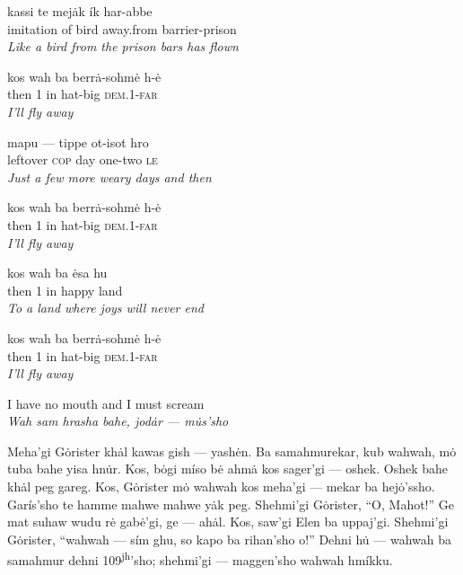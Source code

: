\documentclass{article}[10pt]
\begin{document}
\begin{exe}
\ex
\gll kassi te mej\.{a}k \'{i}k har-abbe\\
imitation of bird away.from barrier-prison\\
\trans \emph{Like a bird from the prison bars has flown}

\ex
\gll kos wah ba berr\.{a}-sohm\.{e} h-\.{e}\\
then 1 in hat-big \textsc{dem.1}-\textsc{far}\\
\trans \emph{I'll fly away}

\ex
\gll mapu --- tippe ot-isot hro\\
leftover \textsc{cop} day one-two \textsc{le}\\
\trans \emph{Just a few more weary days and then}

\ex
\gll kos wah ba berr\.{a}-sohm\.{e} h-\.{e}\\
then 1 in hat-big \textsc{dem.1}-\textsc{far}\\
\trans \emph{I'll fly away}

\ex
\gll kos wah ba \.{e}sa hu\\
then 1 in happy land\\
\trans \emph{To a land where joys will never end}

\ex
\gll kos wah ba berr\.{a}-sohm\.{e} h-\.{e}\\
then 1 in hat-big \textsc{dem.1}-\textsc{far}\\
\trans \emph{I'll fly away}

\end{exe}
\clearpage

\begin{center}
I have no mouth and I must scream\\
\emph{Wah sam hrasha bahe, jod\.{a}r --- m\.{u}s'sho}\\
\end{center}

Meha'gi G\.{o}rister kh\.{a}l kawas gish --- yash\.{e}n. Ba samahmurekar, kub wahwah, m\.{o} tuba bahe yisa hn\.{u}r. Kos, b\.{o}gi m\'{i}so b\.{e} ahm\.{a} kos sager'gi --- oshek. Oshek bahe kh\.{a}l peg gareg. Kos, G\.{o}rister m\.{o} wahwah kos meha'gi --- mekar ba hej\.{o}'ssho. Gar\'{i}s'sho te hamme mahwe mahwe y\.{a}k peg. Shehmi'gi G\.{o}rister, ``O, Mahot!'' Ge mat suhaw wudu r\.{e} gab\.{e}'gi, ge --- ah\.{a}l. Kos, saw'gi Elen ba uppaj'gi. Shehmi'gi G\.{o}rister, ``wahwah --- s\'{i}m ghu, so kapo ba rihan'sho o!'' Dehni h\.{u} --- wahwah ba samahmur dehni 109\textsuperscript{jh}'sho; shehmi'gi --- maggen'sho wahwah hm\'{i}kku.\\
\end{document}

